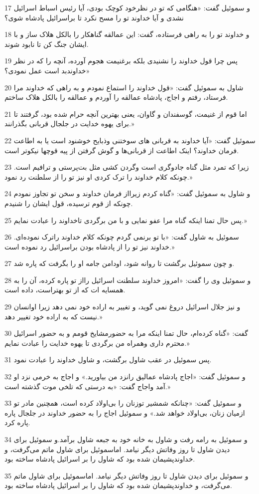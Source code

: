 \par 17 و سموئیل گفت: «هنگامی که تو در نظرخود کوچک بودی، آیا رئیس اسباط اسرائیل نشدی و آیا خداوند تو را مسح نکرد تا براسرائیل پادشاه شوی؟
\par 18 و خداوند تو را به راهی فرستاده، گفت: این عمالقه گناهکار را بالکل هلاک ساز و با ایشان جنگ کن تا نابود شوند. 
\par 19 پس چرا قول خداوند را نشنیدی بلکه برغنیمت هجوم آورده، آنچه را که در نظر خداوندبد است عمل نمودی؟»
\par 20 شاول به سموئیل گفت: «قول خداوند را استماع نمودم و به راهی که خداوند مرا فرستاد، رفتم و اجاج، پادشاه عمالقه را آوردم و عمالقه را بالکل هلاک ساختم.
\par 21 اما قوم از غنیمت، گوسفندان و گاوان، یعنی بهترین آنچه حرام شده بود، گرفتند تا برای یهوه خدایت در جلجال قربانی بگذرانند.»
\par 22 سموئیل گفت: «آیا خداوند به قربانی های سوختنی وذبایح خوشنود است یا به اطاعت فرمان خداوند؟ اینک اطاعت از قربانی‌ها و گوش گرفتن از پیه قوچها نیکوتر است.
\par 23 زیرا که تمرد مثل گناه جادوگری است وگردن کشی مثل بت‌پرستی و ترافیم است. چونکه کلام خداوند را ترک کردی او نیز تو را از سلطنت رد نمود.»
\par 24 و شاول به سموئیل گفت: «گناه کردم زیرااز فرمان خداوند و سخن تو تجاوز نمودم چونکه از قوم ترسیده، قول ایشان را شنیدم.
\par 25 پس حال تمنا اینکه گناه مرا عفو نمایی و با من برگردی تاخداوند را عبادت نمایم.»
\par 26 سموئیل به شاول گفت: «با تو برنمی گردم چونکه کلام خداوند راترک نموده‌ای. خداوند نیز تو را از پادشاه بودن براسرائیل رد نموده است.»
\par 27 و چون سموئیل برگشت تا روانه شود، اودامن جامه او را بگرفت که پاره شد.
\par 28 و سموئیل وی را گفت: «امروز خداوند سلطنت اسرائیل رااز تو پاره کرده، آن را به همسایه ات که از تو بهتراست، داده است.
\par 29 و نیز جلال اسرائیل دروغ نمی گوید، و تغییر به اراده خود نمی دهد زیرا اوانسان نیست که به اراده خود تغییر دهد.»
\par 30 گفت: «گناه کرده‌ام، حال تمنا اینکه مرا به حضورمشایخ قومم و به حضور اسرائیل محترم داری وهمراه من برگردی تا یهوه خدایت را عبادت نمایم.»
\par 31 پس سموئیل در عقب شاول برگشت، و شاول خداوند را عبادت نمود.
\par 32 و سموئیل گفت: «اجاج پادشاه عمالیق رانزد من بیاورید.» و اجاج به خرمی نزد او آمد واجاج گفت: «به درستی که تلخی موت گذشته است.»
\par 33 و سموئیل گفت: «چنانکه شمشیر توزنان را بی‌اولاد کرده است، همچنین مادر تو ازمیان زنان، بی‌اولاد خواهد شد.» و سموئیل اجاج را به حضور خداوند در جلجال پاره پاره کرد.
\par 34 و سموئیل به رامه رفت و شاول به خانه خود به جبعه شاول برآمد.و سموئیل برای دیدن شاول تا روز وفاتش دیگر نیامد. اماسموئیل برای شاول ماتم می‌گرفت، و خداوندپشیمان شده بود که شاول را بر اسرائیل پادشاه ساخته بود.
\par 35 و سموئیل برای دیدن شاول تا روز وفاتش دیگر نیامد. اماسموئیل برای شاول ماتم می‌گرفت، و خداوندپشیمان شده بود که شاول را بر اسرائیل پادشاه ساخته بود.
 
